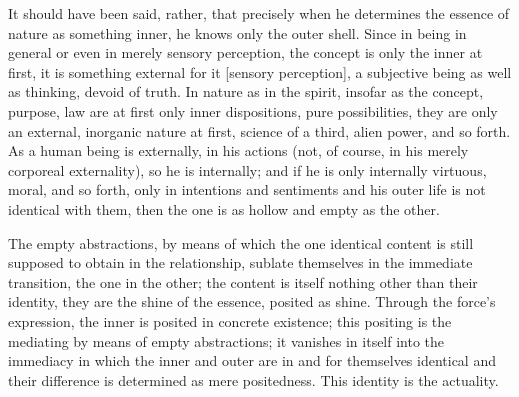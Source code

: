     It should have been said, rather,
    that precisely when he determines
    the essence of nature as something inner,
    he knows only the outer shell.
    Since in being in general
    or even in merely sensory perception,
    the concept is only the inner at first,
    it is something external for it [sensory perception],
    a subjective being as well as thinking, devoid of truth.
    In nature as in the spirit, insofar as
    the concept, purpose, law are at first
    only inner dispositions, pure possibilities,
    they are only an external, inorganic nature at first,
    science of a third, alien power, and so forth.
    As a human being is externally, in his actions
    (not, of course, in his merely corporeal externality),
    so he is internally;
    and if he is only internally virtuous, moral, and so forth,
    only in intentions and sentiments
    and his outer life is not identical with them,
    then the one is as hollow and empty as the other.

The empty abstractions, by means of which
the one identical content is still supposed
to obtain in the relationship,
sublate themselves in the immediate transition,
the one in the other;
the content is itself nothing other than their identity,
they are the shine of the essence, posited as shine.
Through the force's expression, the inner is posited in concrete existence;
this positing is the mediating by means of empty abstractions;
it vanishes in itself into the immediacy in which
the inner and outer are in and for themselves identical and
their difference is determined as mere positedness.
This identity is the actuality.
